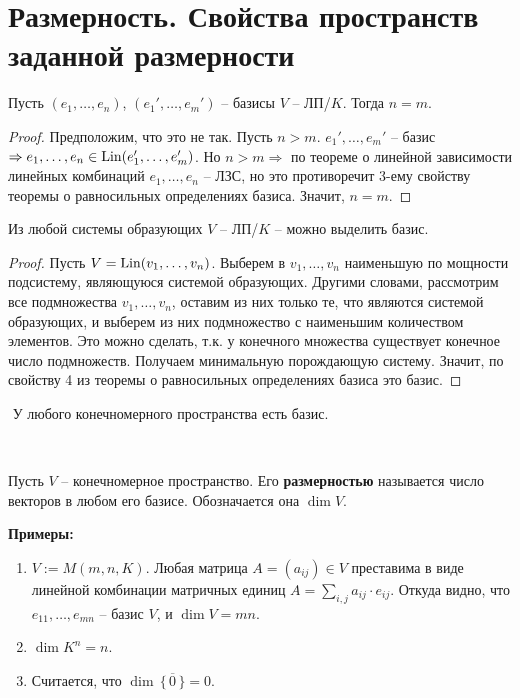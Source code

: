 
\section{Размерность. Свойства пространств заданной размерности}

\begin{theorem-non}
\end{theorem-non}
Пусть $(e_1, \dots, e_n)$, $(e_1', \dots, e_m')$ -- базисы $V$ -- ЛП/$K$.
Тогда $n = m$.
\begin{proof}
    Предположим, что это не так. Пусть $n > m$. $e_1', \dots, e_m'$ --
    базис $\Rightarrow e_1, \dots, e_n \in \operatorname{Lin}(e_1', \dots, e_m')$.
    Но $n > m \Rightarrow$ по теореме о линейной зависимости 
    линейных комбинаций $e_1, \dots, e_n$ -- ЛЗС, но это противоречит
    3-ему свойству теоремы о равносильных определениях базиса. 
    Значит, $n = m$.
\end{proof}

\begin{theorem-non}
\end{theorem-non}
Из любой системы образующих $V$ -- ЛП/$K$ -- можно выделить
базис.
\begin{proof}
    Пусть $V = \operatorname{Lin}(v_1, \dots, v_n)$. Выберем в $v_1, \dots, v_n$
    наименьшую по мощности подсистему, являющуюся системой образующих.
    Другими словами, рассмотрим все подмножества $v_1, \dots, v_n$,
    оставим из них только те, что являются системой образующих, и
    выберем из них подмножество с наименьшим количеством элементов.
    Это можно сделать, т.к. у конечного множества существует конечное 
    число подмножеств. Получаем минимальную порождающую систему.
    Значит, по свойству 4 из теоремы о равносильных определениях базиса
    это базис.
\end{proof}

\follow $ $ У любого конечномерного пространства есть базис.

\
\begin{conj}
Пусть $V$ -- конечномерное пространство. Его \textbf{размерностью} 
называется число векторов в любом его базисе. Обозначается она $\dim V$.
\end{conj}

\textbf{Примеры:}
\begin{enumerate}
    \item $V := M(m, n, K)$. Любая матрица $A = (a_{ij}) \in V$
    преставима в виде линейной комбинации матричных единиц $A =
    \sum_{i, j} a_{ij} \cdot e_{ij}$. Откуда видно, что
    $e_{11}, \dots, e_{mn}$ -- базис $V$, и $\dim V = mn$.

    \item $\dim K^n = n$.
    
    \item Считается, что $\dim \, \{ \, \overline{0} \, \} = 0$.
\end{enumerate}

